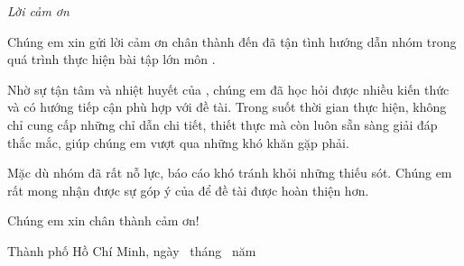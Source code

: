 \begin{center}
    {\fontsize{24pt}{24pt}\selectfont\textit{Lời cảm ơn}}
\end{center}
\vspace{1em}

Chúng em xin gửi lời cảm ơn chân thành đến \GVHDXungHo{} \GVHD{} đã tận tình hướng dẫn nhóm
trong quá trình thực hiện bài tập lớn môn \TenMonHoc.

Nhờ sự tận tâm và nhiệt huyết của \GVHDXungHo, chúng em đã học hỏi được nhiều kiến thức
và có hướng tiếp cận phù hợp với đề tài. Trong suốt thời gian thực hiện, \GVHDXungHo{}
không chỉ cung cấp những chỉ dẫn chi tiết, thiết thực mà còn luôn sẵn sàng giải đáp
thắc mắc, giúp chúng em vượt qua những khó khăn gặp phải.

Mặc dù nhóm đã rất nỗ lực, báo cáo khó tránh khỏi những thiếu sót. Chúng em rất mong
nhận được sự góp ý của \GVHDXungHo{} để đề tài được hoàn thiện hơn.

Chúng em xin chân thành cảm ơn!

\begin{flushright}
    Thành phố Hồ Chí Minh, ngày \the\day\ tháng \the\month\ năm \the\year\\[4pt]
    \textit{\TenNhom}
\end{flushright}

